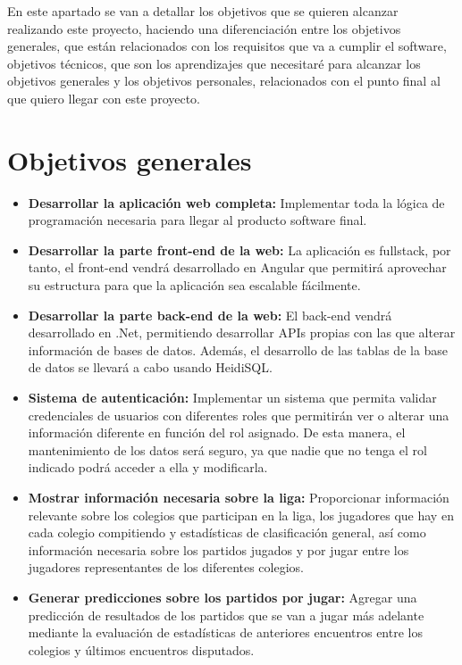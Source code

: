 
En este apartado se van a detallar los objetivos que se quieren alcanzar realizando este proyecto, haciendo una diferenciación entre los objetivos generales, que están relacionados con los requisitos que va a cumplir el software, objetivos técnicos, que son los aprendizajes que necesitaré para alcanzar los objetivos generales y los objetivos personales, relacionados con el punto final al que quiero llegar con este proyecto.

\section{Objetivos generales}\label{objetivos-generales}

\begin{itemize}
\tightlist
\item	
\textbf{Desarrollar la aplicación web completa:} Implementar toda la lógica de programación necesaria para llegar al producto software final.

\item
\textbf{Desarrollar la parte front-end de la web:} La aplicación es fullstack, por tanto, el front-end vendrá desarrollado en Angular que permitirá aprovechar su estructura para que la aplicación sea escalable fácilmente.

\item
\textbf{Desarrollar la parte back-end de la web:} El back-end vendrá desarrollado en .Net, permitiendo desarrollar APIs propias con las que alterar información de bases de datos. Además, el desarrollo de las tablas de la base de datos se llevará a cabo usando HeidiSQL.

\item
\textbf{Sistema de autenticación:} Implementar un sistema que permita validar credenciales de usuarios con diferentes roles que permitirán ver o alterar una información diferente en función del rol asignado. De esta manera, el mantenimiento de los datos será seguro, ya que nadie que no tenga el rol indicado podrá acceder a ella y modificarla.

\item
\textbf{Mostrar información necesaria sobre la liga:} Proporcionar información relevante sobre los colegios que participan en la liga, los jugadores que hay en cada colegio compitiendo y estadísticas de clasificación general, así como información necesaria sobre los partidos jugados y por jugar entre los jugadores representantes de los diferentes colegios.

\item
\textbf{Generar predicciones sobre los partidos por jugar:} Agregar una predicción de resultados de los partidos que se van a jugar más adelante mediante la evaluación de estadísticas de anteriores encuentros entre los colegios y últimos encuentros disputados.
\end{itemize}





